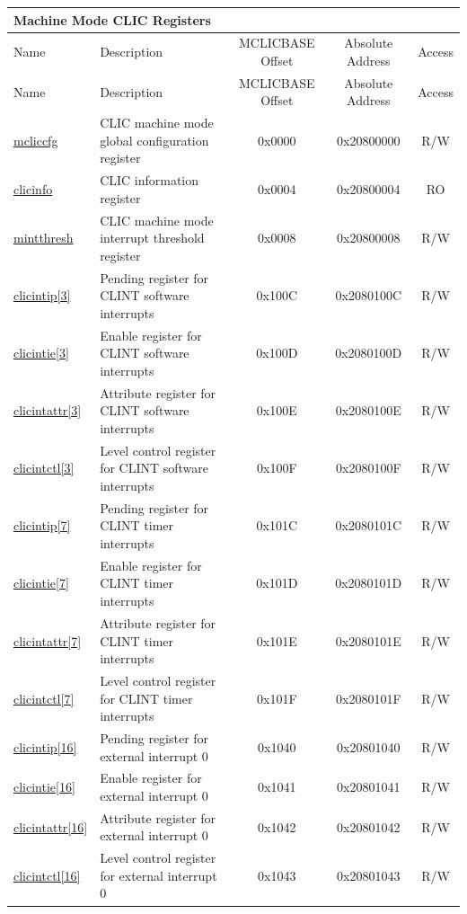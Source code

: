 \begin{longtable}{ | p{1.8cm} | p{7.5cm} | c | c | c | }
\hline
\multicolumn{5}{|l|}{\textbf{Machine Mode CLIC Registers}} \\\hline
\hline\rowcolor{lightgray}
Name & Description & MCLICBASE Offset & Absolute Address & Access \\ \hline
\endfirsthead
\hline
\rowcolor{lightgray}
Name & Description & MCLICBASE Offset & Absolute Address & Access \\
\hline
\endhead
\endfoot
\hyperref[regdesc:MCLICCFG_REG]{mcliccfg} & CLIC machine mode global configuration register & 0x0000 & 0x20800000 & R/W \\\hline
\hyperref[regdesc:CLICINFO_REG]{clicinfo} & CLIC information register & 0x0004 & 0x20800004 & RO \\\hline
\hyperref[regdesc:MINTTHRESH]{mintthresh} & CLIC machine mode interrupt threshold register & 0x0008 & 0x20800008 & R/W \\\hline

\hyperref[regdesc:MCLICINTIP_REG_i]{clicintip[3]} & Pending register for CLINT software interrupts & 0x100C & 0x2080100C & R/W \\\hline
\hyperref[regdesc:MCLICINTIE_REG_i]{clicintie[3]} & Enable register for CLINT software interrupts & 0x100D & 0x2080100D & R/W \\\hline
\hyperref[regdesc:MCLICINTATTR_REG_i]{clicintattr[3]} & Attribute register for CLINT software interrupts & 0x100E & 0x2080100E & R/W \\\hline
\hyperref[regdesc:MCLICINTCTL_REG_i]{clicintctl[3]} & Level control register for CLINT software interrupts & 0x100F & 0x2080100F & R/W \\\hline

\hyperref[regdesc:MCLICINTIP_REG_i]{clicintip[7]} & Pending register for CLINT timer interrupts & 0x101C & 0x2080101C & R/W \\\hline
\hyperref[regdesc:MCLICINTIE_REG_i]{clicintie[7]} & Enable register for CLINT timer interrupts & 0x101D & 0x2080101D & R/W \\\hline
\hyperref[regdesc:MCLICINTATTR_REG_i]{clicintattr[7]} & Attribute register for CLINT timer interrupts & 0x101E & 0x2080101E & R/W \\\hline
\hyperref[regdesc:MCLICINTCTL_REG_i]{clicintctl[7]} & Level control register for CLINT timer interrupts & 0x101F & 0x2080101F & R/W \\\hline

\hyperref[regdesc:MCLICINTIP_REG_i]{clicintip[16]} & Pending register for external interrupt 0 & 0x1040 & 0x20801040 & R/W \\\hline
\hyperref[regdesc:MCLICINTIE_REG_i]{clicintie[16]} & Enable register for external interrupt 0 & 0x1041 & 0x20801041 & R/W \\\hline
\hyperref[regdesc:MCLICINTATTR_REG_i]{clicintattr[16]} & Attribute register for external interrupt 0 & 0x1042 & 0x20801042 & R/W \\\hline
\hyperref[regdesc:MCLICINTCTL_REG_i]{clicintctl[16]} & Level control register for  external interrupt 0 & 0x1043 & 0x20801043 & R/W \\\hline


\end{longtable}
